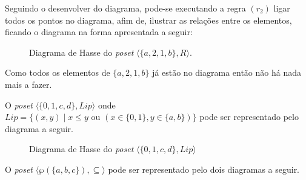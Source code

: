 Seguindo o desenvolver do diagrama, pode-se executando a regra $(r_2)$ ligar todos os pontos no diagrama, afim de, ilustrar as relações entre os elementos, ficando o diagrama na forma apresentada a seguir:

\begin{figure}[h]
  \centering
  \caption{Diagrama de Hasse do \textit{poset} $\langle \{a, 2, 1, b\}, R \rangle$.}
  \label{fig:DiagramaHasse1}
\end{figure}

Como todos os elementos de $\{a, 2, 1, b\}$ já estão no diagrama então não há nada mais a fazer.

\begin{exemplo}
	O \textit{poset} $\langle \{0, 1, c, d\}, Lip \rangle$ onde $Lip = \{(x, y) \mid x \leq y \text{ ou } (x \in \{0, 1\}, y \in \{a,b\}) \}$ pode ser representado pelo diagrama a seguir.
\end{exemplo}

\begin{figure}[h]
  \centering
  \caption{Diagrama de Hasse do \textit{poset} $\langle \{0, 1, c, d\}, Lip \rangle$}
  \label{fig:DiagramaHasse2}
\end{figure}

\begin{exemplo}
  O \textit{poset} $\langle \wp(\{a, b, c\}), \subseteq \rangle$ pode ser representado pelo dois diagramas a seguir.
\end{exemplo}


